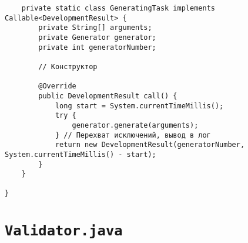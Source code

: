 \begin{verbatim}
    private static class GeneratingTask implements Callable<DevelopmentResult> {
        private String[] arguments;
        private Generator generator;
        private int generatorNumber;
        
        // Конструктор
        
        @Override
        public DevelopmentResult call() {
            long start = System.currentTimeMillis();
            try {
                generator.generate(arguments);
            } // Перехват исключений, вывод в лог
            return new DevelopmentResult(generatorNumber, System.currentTimeMillis() - start);
        }
    }
    
}
\end{verbatim}

\section*{\texttt{Validator.java}}
